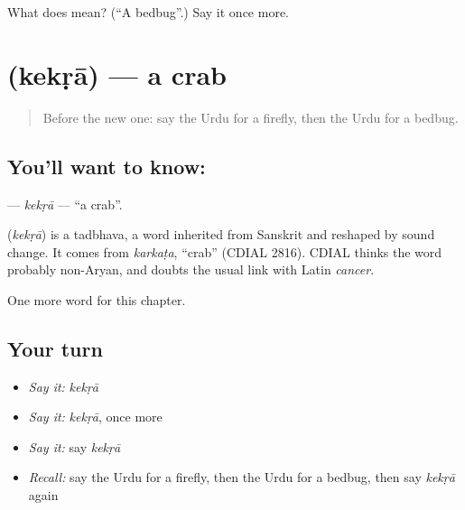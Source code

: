 \begin{tcolorbox}[breakable,colback=teal!4,colframe=teal!35!black,title={Before you move on}]
What does  mean? (\textquotedblleft{}A bedbug\textquotedblright{}.) Say it once more.
\end{tcolorbox}
\section[\texorpdfstring{\ur{کیکڑا} (kekṛā)}{کیکڑا (kekṛā)}]{ (kekṛā) — a crab}

\label{lesson:UR-C235-kekra}



\begin{quote}
Before the new one: say the Urdu for a firefly, then the Urdu for a bedbug.
\end{quote}

\subsection*{You'll want to know: }
\textbf{} — \emph{kekṛā} — \textquotedblleft{}a crab\textquotedblright{}.

\begin{cousinweb}
\textbf{} (\emph{kekṛā}) is a tadbhava, a word inherited from Sanskrit and reshaped by sound change. It comes from \emph{karkaṭa}, \textquotedblleft{}crab\textquotedblright{} (CDIAL 2816). CDIAL thinks the word probably non-Aryan, and doubts the usual link with Latin \emph{cancer}.
\end{cousinweb}

\begin{grammarlens}[title={What you've built}]
One more word for this chapter.
\end{grammarlens}

\subsection*{Your turn}
\begin{itemize}
\raggedright
  \item \emph{Say it:} \emph{kekṛā}
  \item \emph{Say it:} \emph{kekṛā}, once more
  \item \emph{Say it:} say \emph{kekṛā}
  \item \emph{Recall:} say the Urdu for a firefly, then the Urdu for a bedbug, then say \emph{kekṛā} again
\end{itemize}

